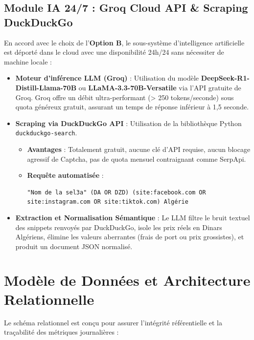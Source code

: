 \documentclass[11pt,a4paper]{article}
\begin{document}
\subsection{Module IA 24/7 : Groq Cloud API \& Scraping DuckDuckGo}
En accord avec le choix de l'\textbf{Option B}, le sous-système d'intelligence artificielle est déporté dans le cloud avec une disponibilité 24h/24 sans nécessiter de machine locale :
\begin{itemize}[leftmargin=*]
    \item \textbf{Moteur d'inférence LLM (Groq)} : Utilisation du modèle \textbf{DeepSeek-R1-Distill-Llama-70B} ou \textbf{LLaMA-3.3-70B-Versatile} via l'API gratuite de Groq. Groq offre un débit ultra-performant (> 250 tokens/seconde) sous quota généreux gratuit, assurant un temps de réponse inférieur à 1,5 seconde.
    \item \textbf{Scraping via DuckDuckGo API} : Utilisation de la bibliothèque Python \texttt{duckduckgo-search}. 
    \begin{itemize}
        \item \textbf{Avantages} : Totalement gratuit, aucune clé d'API requise, aucun blocage agressif de Captcha, pas de quota mensuel contraignant comme SerpApi.
        \item \textbf{Requête automatisée} :
        \begin{center}
            \texttt{"Nom de la sel3a" (DA OR DZD) (site:facebook.com OR site:instagram.com OR site:tiktok.com) Algérie}
        \end{center}
    \end{itemize}
    \item \textbf{Extraction et Normalisation Sémantique} : Le LLM filtre le bruit textuel des snippets renvoyés par DuckDuckGo, isole les prix réels en Dinars Algériens, élimine les valeurs aberrantes (frais de port ou prix grossistes), et produit un document JSON normalisé.
\end{itemize}

\section{Modèle de Données et Architecture Relationnelle}

Le schéma relationnel est conçu pour assurer l'intégrité référentielle et la traçabilité des métriques journalières :
\end{document}

